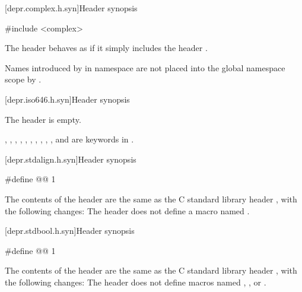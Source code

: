 [depr.complex.h.syn]{Header  synopsis}

%
\begin{codeblock}
#include <complex>
\end{codeblock}

\pnum
The header 
behaves as if it simply includes the header
.

\pnum
\begin{note}
Names introduced by  in namespace 
are not placed into the global namespace scope by .
\end{note}

[depr.iso646.h.syn]{Header  synopsis}

%
\pnum
The \Cpp{} header  is empty.
\begin{note}
,
,
,
,
,
,
,
,
,
, and
are keywords in \Cpp{}.
\end{note}

[depr.stdalign.h.syn]{Header  synopsis}

%
%
\begin{codeblock}
#define @@ 1
\end{codeblock}

\pnum
The contents of the \Cpp{} header  are the same as the C
standard library header , with the following changes:
The header  does not
define a macro named .


\newpage

[depr.stdbool.h.syn]{Header  synopsis}

%
%
%
\begin{codeblock}
#define @@ 1
\end{codeblock}

\pnum
The contents of the \Cpp{} header  are the same as the C
standard library header , with the following changes:
The header  does not
define macros named , , or .

